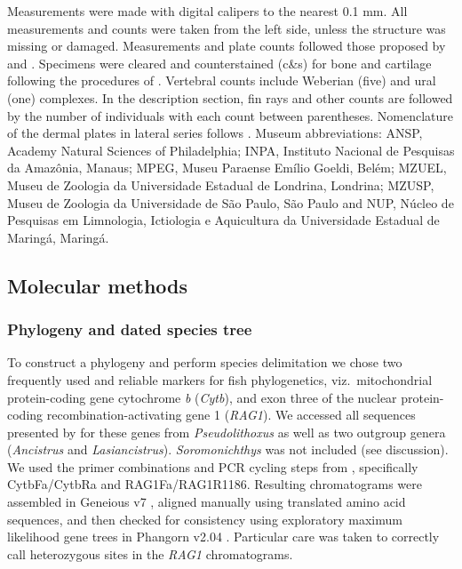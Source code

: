 \documentclass[12pt]{article}
\begin{document}
Measurements were made with digital calipers to the nearest 0.1 mm. %
All measurements and counts were taken from the left side, unless the structure was missing or damaged. %
Measurements and plate counts followed those proposed by \citet{Fisch-Muller2001} and \citet{Bifi2009}. %
Specimens were cleared and counterstained (c\&s) for bone and cartilage following the procedures of \citet{Taylor1985}. %
Vertebral counts include Weberian (five) and ural (one) complexes. %
In the description section, fin rays and other counts are followed by the number of individuals with each count between parentheses. %
Nomenclature of the dermal plates in lateral series follows \citet{Schaefer1997}. %
Museum abbreviations: ANSP, Academy Natural Sciences of Philadelphia; INPA, Instituto Nacional de Pesquisas da Amazônia, Manaus; MPEG, Museu Paraense Emílio Goeldi, Belém; MZUEL, Museu de Zoologia da Universidade Estadual de Londrina, Londrina; MZUSP, Museu de Zoologia da Universidade de São Paulo, São Paulo and NUP, Núcleo de Pesquisas em Limnologia, Ictiologia e Aquicultura da Universidade Estadual de Maringá, Maringá.%


\subsection*{Molecular methods}

\subsubsection*{Phylogeny and dated species tree}

To construct a phylogeny and perform species delimitation we chose two frequently used and reliable markers for fish phylogenetics, viz.\ mitochondrial protein-coding gene cytochrome \emph{b} (\emph{Cytb}), and exon three of the nuclear protein-coding recombination-activating gene 1 (\emph{RAG1}). %
We accessed all sequences presented by \citet{Lujan2015phylo} for these genes from \emph{Pseudolithoxus} as well as two outgroup genera (\emph{Ancistrus} and\emph{ Lasiancistrus}). %
\emph{Soromonichthys} was not included (see discussion). %
We used the primer combinations and PCR cycling steps from \citet{Lujan2015phylo}, specifically CytbFa/CytbRa and RAG1Fa/RAG1R1186. Resulting chromatograms were assembled in Geneious v7 \citep{Kearse2012}, aligned manually using translated amino acid sequences, and then checked for consistency using exploratory maximum likelihood gene trees in Phangorn v2.04 \citep{Schliep2011}. %
Particular care was taken to correctly call heterozygous sites in the \emph{RAG1} chromatograms. 
\end{document}

